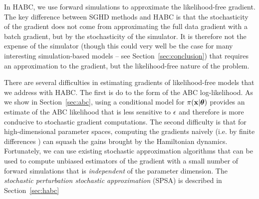 \documentclass[]{article}
\begin{document}
In HABC, we use forward simulations to approximate the likelihood-free gradient. The key difference between SGHD methods and HABC is that the stochasticity of the gradient does not come from approximating the full data gradient with a batch gradient, but by the stochasticity of the simulator.  It is therefore not the expense of the simulator (though this could very well be the case for many interesting simulation-based models -- see Section~\ref{sec:conclusion}) that requires an approximation to the gradient, but the likelihood-free nature of the problem.  

There are several difficulties in estimating gradients of likelihood-free models that we address with HABC.  The first is do to the form of the ABC log-likelihood.  As we show in Section~\ref{sec:abc}, using a conditional model for $\pi( {\bf x} | {\bm \theta} )$ provides an estimate of the ABC likelihood that is less sensitive to $\epsilon$ and therefore is more conducive to stochastic gradient computations.  The second difficulty is that for high-dimensional parameter spaces, computing the gradients naively (i.e. by finite differences \cite{kiefer1952stochastic}) can squash the gains brought by the Hamiltonian dynamics.  Fortunately, we can use existing stochastic approximation algorithms \cite{spall1992multivariate,spall2000adaptive} that can be used to compute unbiased estimators of the gradient with a small number of forward simulations that is {\em independent} of the parameter dimension.  The {\em stochastic perturbation stochastic approximation} (SPSA) \cite{spall1992multivariate} is described in Section~\ref{sec:habc}




\end{document}
